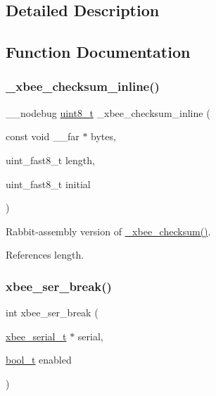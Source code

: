 \subsection{Detailed Description}


\subsection{Function Documentation}
\mbox{\label{group__hal__rabbit_ga02da89986736815045b1a11e1c58733e}} 
\subsubsection{\texorpdfstring{\+\_\+xbee\+\_\+checksum\+\_\+inline()}{\_xbee\_checksum\_inline()}}
{\footnotesize\ttfamily \+\_\+\+\_\+nodebug \hyperlink{group__hal__dos_gae1affc9ca37cfb624959c866a73f83c2}{uint8\+\_\+t} \+\_\+xbee\+\_\+checksum\+\_\+inline (\begin{DoxyParamCaption}\item[{const void \+\_\+\+\_\+far $\ast$}]{bytes,  }\item[{uint\+\_\+fast8\+\_\+t}]{length,  }\item[{uint\+\_\+fast8\+\_\+t}]{initial }\end{DoxyParamCaption})}



Rabbit-\/assembly version of \hyperlink{group__xbee__device_gae8a32665036083d3a236fcde4359cc79}{\+\_\+xbee\+\_\+checksum()}. 



References length.

\mbox{\label{group__hal__rabbit_ga6ae89792415a7ac8b45b56188eb9eeb4}} 
\subsubsection{\texorpdfstring{xbee\+\_\+ser\+\_\+break()}{xbee\_ser\_break()}}
{\footnotesize\ttfamily int xbee\+\_\+ser\+\_\+break (\begin{DoxyParamCaption}\item[{\hyperlink{structxbee__serial__t}{xbee\+\_\+serial\+\_\+t} $\ast$}]{serial,  }\item[{\hyperlink{group__hal__dos_ga04dd5074964518403bf944f2b240a5f8}{bool\+\_\+t}}]{enabled }\end{DoxyParamCaption})}



